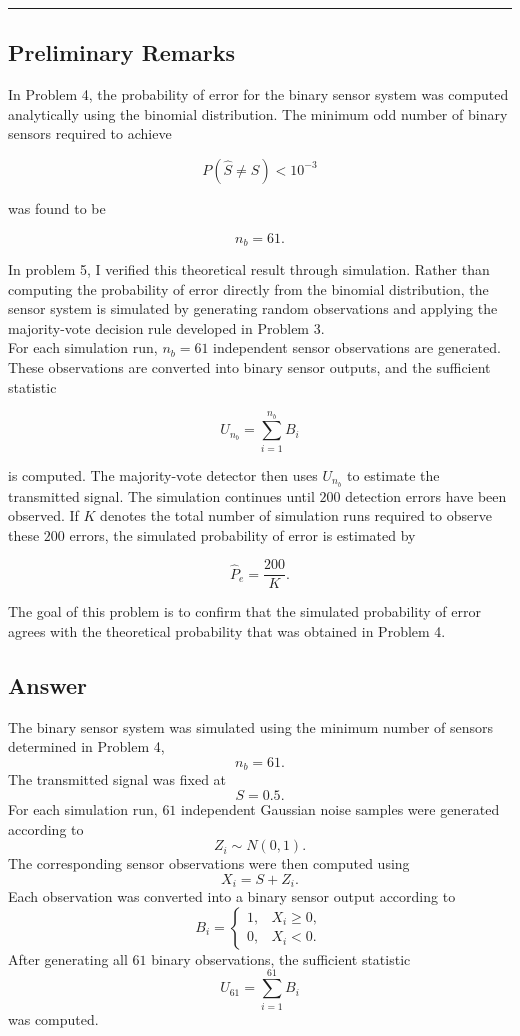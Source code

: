 \documentclass[12pt,a4paper]{article}
\begin{document}
\hrule

\subsection{Preliminary Remarks}

In Problem 4, the probability of error for the binary sensor system was computed analytically using the binomial distribution. The minimum odd number of binary sensors required to achieve

\[
P(\hat{S}\neq S)<10^{-3}
\]

was found to be

\[
n_b=61.
\]

In problem 5, I verified this theoretical result through simulation. Rather than computing the probability of error directly from the binomial distribution, the sensor system is simulated by generating random observations and applying the majority-vote decision rule developed in Problem 3.\\

For each simulation run, \(n_b=61\) independent sensor observations are generated. These observations are converted into binary sensor outputs, and the sufficient statistic

\[
U_{n_b}
=
\sum_{i=1}^{n_b} B_i
\]

is computed. The majority-vote detector then uses \(U_{n_b}\) to estimate the transmitted signal. The simulation continues until \(200\) detection errors have been observed. If \(K\) denotes the total number of simulation runs required to observe these \(200\) errors, the simulated probability of error is estimated by

\[
\hat{P}_e=\frac{200}{K}.
\]

The goal of this problem is to confirm that the simulated probability of error agrees with the theoretical probability that was obtained in Problem 4.

\subsection{Answer}

The binary sensor system was simulated using the minimum number of sensors determined in Problem 4,
\[
n_b=61.
\]
The transmitted signal was fixed at
\[
S=0.5.
\]
For each simulation run, \(61\) independent Gaussian noise samples were generated according to
\[
Z_i\sim N(0,1).
\]
The corresponding sensor observations were then computed using
\[
X_i=S+Z_i.
\]
Each observation was converted into a binary sensor output according to
\[
B_i=
\begin{cases}
1, & X_i\geq 0,\\
0, & X_i<0.
\end{cases}
\]
After generating all \(61\) binary observations, the sufficient statistic
\[
U_{61}
=
\sum_{i=1}^{61}B_i
\]
was computed.\\
\end{document}
